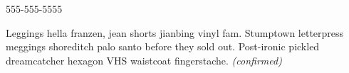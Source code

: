 \documentclass{report}
\begin{document}
                555-555-5555\newline

                Leggings hella franzen, jean shorts jianbing vinyl fam. Stumptown letterpress meggings shoreditch palo santo before they sold out. Post-ironic pickled dreamcatcher hexagon VHS waistcoat fingerstache.
                \emph{ (confirmed) }
              

              

              

              
\end{document}
